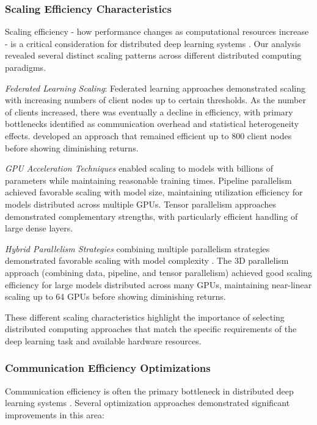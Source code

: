 \documentclass[acmsmall]{acmart}
\begin{document}
\subsubsection{Scaling Efficiency Characteristics}\label{subsubsec:distributed-computing-approaches-rq21:scaling-efficiency-characteristics}
Scaling efficiency - how performance changes as computational resources increase - is a critical consideration for distributed deep learning systems \citep{Zhang20229876}. Our analysis revealed several distinct scaling patterns across different distributed computing paradigms.

\textit{Federated Learning Scaling}: Federated learning approaches demonstrated scaling with increasing numbers of client nodes up to certain thresholds. As the number of clients increased, there was eventually a decline in efficiency, with primary bottlenecks identified as communication overhead and statistical heterogeneity effects. \citet{Zhang20229876} developed an approach that remained efficient up to 800 client nodes before showing diminishing returns.

\textit{GPU Acceleration Techniques} enabled scaling to models with billions of parameters while maintaining reasonable training times. Pipeline parallelism achieved favorable scaling with model size, maintaining utilization efficiency for models distributed across multiple GPUs. Tensor parallelism approaches demonstrated complementary strengths, with particularly efficient handling of large dense layers.

\textit{Hybrid Parallelism Strategies} combining multiple parallelism strategies demonstrated favorable scaling with model complexity \citep{Narayanan2021}. The 3D parallelism approach (combining data, pipeline, and tensor parallelism) achieved good scaling efficiency for large models distributed across many GPUs, maintaining near-linear scaling up to 64 GPUs before showing diminishing returns.

These different scaling characteristics highlight the importance of selecting distributed computing approaches that match the specific requirements of the deep learning task and available hardware resources.

\subsubsection{Communication Efficiency Optimizations}\label{subsubsec:distributed-computing-approaches-rq21:communication-efficiency-optimizations}
Communication efficiency is often the primary bottleneck in distributed deep learning systems \citep{Alistarh2017}. Several optimization approaches demonstrated significant improvements in this area:
\end{document}
